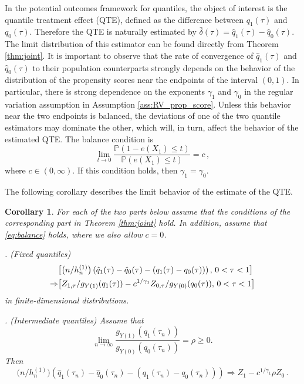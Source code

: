 \documentclass[12pt]{amsart}
\newcommand{\1}{\mathbbm{1}}
\newcommand{\0}{\mathbf{0}}
\theoremstyle{plain}
\newtheorem{corollary}[theorem]{Corollary}
\theoremstyle{definition}
\newcommand{\bbP}{\mathbb{P}}
\begin{document}
In the potential outcomes framework for quantiles, the object of interest is the quantile treatment effect (QTE), defined as the difference between 
$q_1(\tau)$ and $ q_0(\tau)$. Therefore the QTE is naturally estimated by $\hat\delta(\tau)=\hat q_1(\tau)-\hat q_0(\tau)$. 
The limit distribution of this estimator can be found directly from Theorem \ref{thm:joint}. It is important to observe that the rate of convergence of $\hat q_1(\tau)$ and $\hat q_0(\tau)$ to their population counterparts strongly depends on the behavior of the distribution of the propensity scores near the endpoints of the interval $(0,1)$. In particular, there is strong dependence on the exponents $\gamma_1$ and $\gamma_0$ in the regular variation assumption in Assumption \ref{ass:RV_prop_score}. Unless this behavior near the two endpoints is balanced, the deviations of one of the two quantile estimators may dominate the other, which will, in turn, affect the behavior of the estimated QTE. The balance condition is
\begin{equation} \label{eq:balance}
  \lim_{t\to 0} \frac{\bbP(1-e(X_1)\le t)}{\bbP(e(X_1)\le t)} = c\,, 
\end{equation}
where $c\in (0,\infty)$. If this condition holds, then $\gamma_1=\gamma_0$. 

The following corollary  describes the limit behavior of the estimate of the QTE.

\begin{corollary} \label{cor:qte}
For each of the two parts below assume that the conditions of the corresponding part in Theorem \ref{thm:joint} hold. In addition, 
assume that \eqref{eq:balance} holds, where we also allow $c=0$. 

\smallskip 
{}.  (Fixed quantiles) 
\begin{align}\label{eq:qte1}
    &\bigl[ \bigl( n/h_n^{(1)}\bigr)\left( \hat q_1(\tau)-\hat q_0(\tau) -(q_1(\tau)-q_0(\tau))\right), \, 0<\tau<1\bigr] \\
    \notag \Rightarrow  
&\bigl[ Z_{1,\tau}/g_{Y(1)}(q_1(\tau))    
  -c^{1/\gamma_1}Z_{0,\tau}/g_{Y(0)}(q_0(\tau)), \, 0<\tau<1\bigr]
\end{align}
in finite-dimensional distributions. 

\smallskip 
{}.   (Intermediate quantiles)  Assume that 
\begin{equation} \label{eq:g-ratio}
    \lim_{n\to\infty}\frac{g_{Y(1)}(q_1(\tau_n))}{g_{Y(0)}(q_0(\tau_n))}=\rho \geq 0.
\end{equation}
Then
\begin{equation} \label{eq:qte2}
\bigl( n/h_n^{(1)}\bigr)\left( \hat q_1(\tau_n)-\hat q_0(\tau_n) -(q_1(\tau_n)-q_0(\tau_n))\right)\Rightarrow  
Z_{1} 
  -c^{1/\gamma_1}\rho Z_{0}\,.
\end{equation}
\end{corollary}
\end{document}
